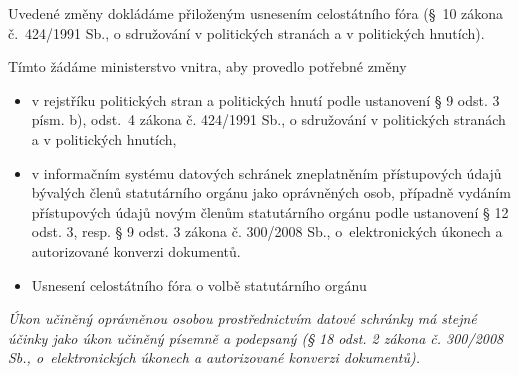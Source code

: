 \documentclass[11pt,a4paper,czech]{article}
\begin{document}
Uvedené změny dokládáme přiloženým usnesením celostátního fóra (§~10 zákona č.~424/1991 Sb., o sdružování v politických stranách a v politických hnutích).

Tímto žádáme ministerstvo vnitra, aby provedlo potřebné změny
\begin{itemize}
\item v rejstříku politických stran a politických hnutí podle ustanovení § 9 odst. 3 písm. b), odst.~4
zákona č. 424/1991 Sb., o sdružování v politických stranách a v politických hnutích,
\item v informačním systému datových schránek zneplatněním přístupových údajů bývalých
členů statutárního orgánu jako oprávněných osob, případně vydáním přístupových údajů novým členům statutárního
orgánu podle ustanovení § 12 odst. 3, resp. § 9 odst. 3 zákona č. 300/2008 Sb., o~elektronických úkonech a autorizované konverzi dokumentů.
\end{itemize}

\signature{S úctou 

\bigskip
PhDr. Ivan Bartoš, Ph. D. \\ předseda Pirátů}

\attachments
\begin{itemize}
\item Usnesení celostátního fóra o volbě statutárního orgánu
\end{itemize}

\bigskip
\emph{Úkon učiněný oprávněnou osobou prostřednictvím datové schránky má stejné účinky jako úkon učiněný písemně a podepsaný (§ 18 odst. 2 zákona č. 300/2008 Sb., o~elektronických úkonech a autorizované konverzi dokumentů).}
\end{document}
